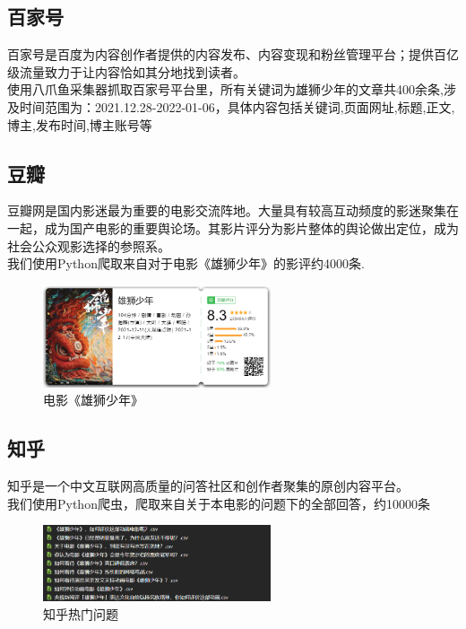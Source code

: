 \documentclass[12pt,a4paper,utf8]{article}
\begin{document}
\subsection{百家号}
百家号是百度为内容创作者提供的内容发布、内容变现和粉丝管理平台；提供百亿级流量致力于让内容恰如其分地找到读者。\\

使用八爪鱼采集器抓取百家号平台里，所有关键词为雄狮少年的文章共400余条,涉及时间范围为：2021.12.28-2022-01-06，具体内容包括关键词,页面网址,标题,正文,博主,发布时间,博主账号等

\subsection{豆瓣}
豆瓣网是国内影迷最为重要的电影交流阵地。大量具有较高互动频度的影迷聚集在一起，成为国产电影的重要舆论场。其影片评分为影片整体的舆论做出定位，成为社会公众观影选择的参照系。 \\

我们使用Python爬取来自对于电影《雄狮少年》的影评约4000条.

\begin{figure}[H]
    \centering
    \includegraphics[width=0.6\textwidth]{images/雄狮少年.png}  
    \caption{电影《雄狮少年》} 
\end{figure} 


\subsection{知乎}
知乎是一个中文互联网高质量的问答社区和创作者聚集的原创内容平台。\\
 
我们使用Python爬虫，爬取来自关于本电影的问题下的全部回答，约10000条 \\
\begin{figure}[H]
    \centering
    \includegraphics[width=0.6\textwidth]{images/知乎问题.png}  
    \caption{知乎热门问题} 
\end{figure} 
\end{document}
